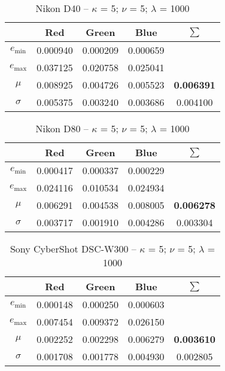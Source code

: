 \begin{appendix}
\begin{table}[htb]
  \centering
    \begin{tabular}{|c||c|c|c|c|}\hline
		   & \textbf{Red} & \textbf{Green} & \textbf{Blue} & \textbf{$\sum$} \\\hline\hline
      $e_\text{min}$ & 0.000940 & 0.000209 & 0.000659 &   \\\hline
      $e_\text{max}$ & 0.037125 & 0.020758 & 0.025041 &   \\\hline
      $\mu$          & 0.008925 & 0.004726 & 0.005523 & \textbf{0.006391} \\\hline
      $\sigma$       & 0.005375 & 0.003240 & 0.003686 & 0.004100 \\\hline
    \end{tabular}
  \caption{Nikon D40 -- $\kappa$ = 5; $\nu$ = 5; $\lambda$ = 1000}
  \label{tab:Nikon D40551000}
\end{table}
\begin{table}
  \centering
    \begin{tabular}{|c||c|c|c|c|}\hline
		   & \textbf{Red} & \textbf{Green} & \textbf{Blue} & \textbf{$\sum$} \\\hline\hline
      $e_\text{min}$ & 0.000417 & 0.000337 & 0.000229 &   \\\hline
      $e_\text{max}$ & 0.024116 & 0.010534 & 0.024934 &   \\\hline
      $\mu$          & 0.006291 & 0.004538 & 0.008005 & \textbf{0.006278} \\\hline
      $\sigma$       & 0.003717 & 0.001910 & 0.004286 & 0.003304 \\\hline
    \end{tabular}
  \caption{Nikon D80 -- $\kappa$ = 5; $\nu$ = 5; $\lambda$ = 1000}
  \label{tab:Nikon D80551000}
\end{table}\begin{table}[htb]
  \centering
    \begin{tabular}{|c||c|c|c|c|}\hline
		   & \textbf{Red} & \textbf{Green} & \textbf{Blue} & \textbf{$\sum$} \\\hline\hline
      $e_\text{min}$ & 0.000148 & 0.000250 & 0.000603 &   \\\hline
      $e_\text{max}$ & 0.007454 & 0.009372 & 0.026150 &   \\\hline
      $\mu$          & 0.002252 & 0.002298 & 0.006279 & \textbf{0.003610} \\\hline
      $\sigma$       & 0.001708 & 0.001778 & 0.004930 & 0.002805 \\\hline
    \end{tabular}
  \caption{Sony CyberShot DSC-W300 -- $\kappa$ = 5; $\nu$ = 5; $\lambda$ = 1000}

\end{table}
\end{appendix}
